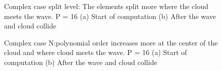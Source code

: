 \begin{figure}[H]
	\centering
	\hfill
	\caption{Complex case split level: The elements split more where the cloud meets the wave. P = 16 (a) Start of computation (b) After the wave and cloud collide}\label{fig:cloud_s}
\end{figure}

\begin{figure}[H]
	\centering
	\hfill
	\caption{Complex case N:\@The polynomial order increases more at the center of the cloud and where cloud meets the wave. P = 16 (a) Start of computation (b) After the wave and cloud collide}\label{fig:cloud_N}
\end{figure}

